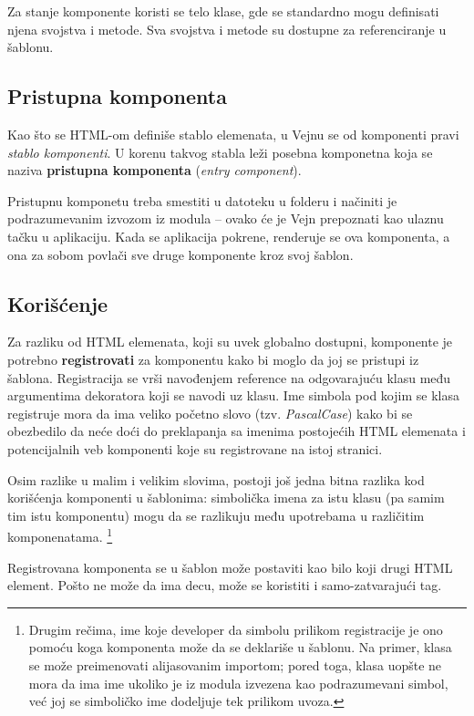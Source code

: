 Za stanje komponente koristi se telo klase, gde se standardno mogu definisati njena svojstva i metode.
Sva svojstva i metode su dostupne za referenciranje u šablonu.

\subsection{Pristupna komponenta}
\label{subsec:pristupna-komponenta}

Kao što se HTML-om definiše stablo elemenata, u Vejnu se od komponenti pravi \emph{stablo komponenti}.
U korenu takvog stabla leži posebna komponetna koja se naziva \textbf{pristupna komponenta} (\textsl{entry component}).

Pristupnu komponetu treba smestiti u datoteku  u folderu  i načiniti je podrazumevanim izvozom iz modula -- ovako će je Vejn prepoznati kao ulaznu tačku u aplikaciju.
Kada se aplikacija pokrene, renderuje se ova komponenta, a ona za sobom povlači sve druge komponente kroz svoj šablon.

\subsection{Korišćenje}

Za razliku od HTML elemenata, koji su uvek globalno dostupni, komponente je potrebno \textbf{registrovati} za komponentu kako bi moglo da joj se pristupi iz šablona.
Registracija se vrši navođenjem reference na odgovarajuću klasu među argumentima dekoratora  koji se navodi uz klasu.
Ime simbola pod kojim se klasa registruje mora da ima veliko početno slovo (tzv. \textsl{PascalCase}) kako bi se obezbedilo da neće doći do preklapanja sa imenima postojećih HTML elemenata i potencijalnih veb komponenti koje su registrovane na istoj stranici.

Osim razlike u malim i velikim slovima, postoji još jedna bitna razlika kod korišćenja komponenti u šablonima: simbolička imena za istu klasu (pa samim tim istu komponentu) mogu da se razlikuju među upotrebama u različitim komponenatama.%
\footnote{Drugim rečima, ime koje developer da simbolu prilikom registracije je ono pomoću koga komponenta može da se deklariše u šablonu.
Na primer, klasa se može preimenovati alijasovanim importom; pored toga, klasa uopšte ne mora da ima ime ukoliko je iz modula izvezena kao podrazumevani simbol, već joj se simboličko ime dodeljuje tek prilikom uvoza.}

Registrovana komponenta se u šablon može postaviti kao bilo koji drugi HTML element.
Pošto ne može da ima decu, može se koristiti i samo-zatvarajući tag.

